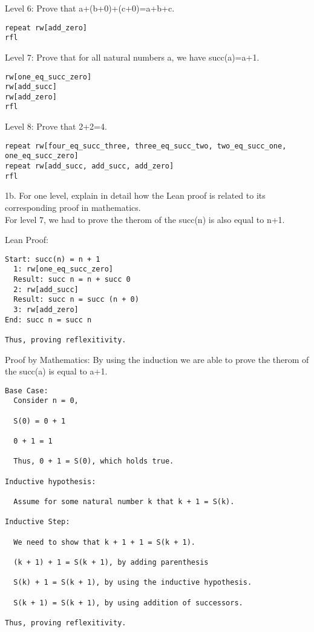 \documentclass{article}
\theoremstyle{theorem}
\theoremstyle{definition}
\theoremstyle{remark}
\begin{document}
Level 6: Prove that a+(b+0)+(c+0)=a+b+c.
\begin{lstlisting}
repeat rw[add_zero]
rfl
\end{lstlisting}

Level 7: Prove that for all natural numbers a, we have succ(a)=a+1.
\begin{lstlisting}
rw[one_eq_succ_zero]
rw[add_succ]
rw[add_zero]
rfl
\end{lstlisting}

Level 8: Prove that 2+2=4.
\begin{lstlisting}
repeat rw[four_eq_succ_three, three_eq_succ_two, two_eq_succ_one, one_eq_succ_zero]
repeat rw[add_succ, add_succ, add_zero]
rfl
\end{lstlisting}

1b. For one level, explain in detail how the Lean proof is related to its corresponding proof in mathematics. \\
For level 7, we had to prove the therom of the succ(n) is also equal to n+1. 

Lean Proof:
\begin{lstlisting}
Start: succ(n) = n + 1
  1: rw[one_eq_succ_zero]
  Result: succ n = n + succ 0
  2: rw[add_succ]
  Result: succ n = succ (n + 0)
  3: rw[add_zero]
End: succ n = succ n

Thus, proving reflexitivity. 
\end{lstlisting}

Proof by Mathematics: By using the induction we are able to prove the therom of the succ(a) is equal to a+1.
\begin{lstlisting}
Base Case:
  Consider n = 0,

  S(0) = 0 + 1

  0 + 1 = 1

  Thus, 0 + 1 = S(0), which holds true.

Inductive hypothesis:

  Assume for some natural number k that k + 1 = S(k).

Inductive Step:

  We need to show that k + 1 + 1 = S(k + 1).

  (k + 1) + 1 = S(k + 1), by adding parenthesis

  S(k) + 1 = S(k + 1), by using the inductive hypothesis.

  S(k + 1) = S(k + 1), by using addition of successors.

Thus, proving reflexitivity.
\end{lstlisting}
\end{document}
